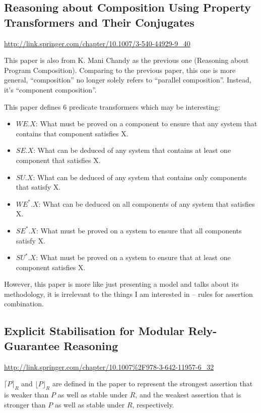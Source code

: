 \documentclass[12pt, fleqn]{article}
\begin{document}
\subsection{Reasoning about Composition Using Property Transformers and Their Conjugates}

\url{http://link.springer.com/chapter/10.1007/3-540-44929-9_40}

\bigskip

This paper is also from K. Mani Chandy as the previous one (Reasoning
about Program Composition). Comparing to the previous paper, this one
is more general, ``composition'' no longer solely refers to ``parallel
composition''. Instead, it's ``component composition''.

This paper defines 6 predicate transformers which may be interesting:

\begin{itemize}
\item $WE.X$: What must be proved on a component to ensure that any
  system that contains that component satisfies X.
\item $SE.X$: What can be deduced of any system that contains at least
  one component that satisfies X.
\item $SU.X$: What can be deduced of any system that contains only
  components that satisfy X.
\item $WE^*.X$: What can be deduced on all components of any system
  that satisfies X.
\item $SE^*.X$: What must be proved on a system to ensure that all
  components satisfy X.
\item $SU^*.X$: What must be proved on a system to ensure that at
  least one component satisfies X.
\end{itemize}

However, this paper is more like just presenting a model and talks
about its methodology, it is irrelevant to the things I am interested
in -- rules for assertion combination.


\subsection{Explicit Stabilisation for Modular Rely-Guarantee Reasoning}

\url{http://link.springer.com/chapter/10.1007\%2F978-3-642-11957-6_32}

\bigskip

$\lceil P \rceil_R$ and $\lfloor P \rfloor_R$ are defined in the paper
to represent the strongest assertion that is weaker than $P$ as well
as stable under $R$, and the weakest assertion that is stronger than
$P$ as well as stable under $R$, respectively.
\end{document}
